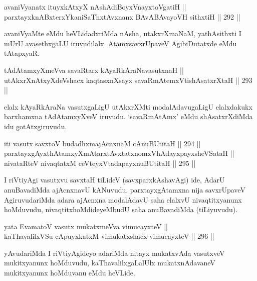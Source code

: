 \begin{shl}
avaniVyanatx ituyxkAtxyX nAshAdiBoyxV\s nayxtoVgatiH || \\
parxtayxknABxterxYkaniSaThxtAvxnanx BAvABAvayoVH sithxtiH \hfill || 292 ||  
\end{shl}

\vskip 2cm
\begin{artha}
avaniVyaMte eMdu heVLidadxriMda nAsha, utakxrXmaNaM, yathAsithxti I mUrU avasethxgaLU iruvudilalx. AtamxsavxrUpaveV AgibiDutatxde eMdu tAtapxyaR.
\end{artha}

\begin{shl}
tAdAtamxyXmeVva savaRtarx kAyaRkAraNavasutxnaH || \\
utAkxrXnAtxyXdeVshacx kaqtasxnXsayx savaRmAtemxVtishAsatxrXtaH \hfill || 293 ||  
\end{shl}

\begin{artha}
elalx kAyaRkAraNa vasutxgaLigU utAkxrXMti modalAdavugaLigU elalxdakukx
barxhamxna tAdAtamxyXveV iruvudu. `savaRmAtAmx' eMdu shAsatxrXdiMda idu gotAtxgiruvudu.
\end{artha}

\begin{shl}
iti vasutx savxtoV budadhxmajAcnxnaM cAnuBUtitaH \hfill || 294 ||  \\
parxtayxgAyxthAtamxyXmAtarxtAvxtatxnomxVhAdayxpayxsheVSataH || \\
nivataRteV nivaqtatxM ceVteyxVtadapayxnuBUtitaH \hfill || 295 ||  
\end{shl}

\begin{artha}
I riVtiyAgi vasutxvu savxtaH tiLideV (savxparxkAshavAgi) ide, AdarU
anuBavadiMda ajAcnxnavU kANuvudu, parxtayxgAtamxna nija savxrUpaveV
AgiruvudariMda adara ajAcnxna modalAdavU saha elalxvU nivaqtitxyanunx
hoMduvudu, nivaqtitxhoMdideyeMbudU saha anuBavadiMda (tiLiyuvudu).
\end{artha}

\begin{shl}
yata EvamatoV vasutx mukatxmeVva vimucayxteV || \\
kaThavalilxVSu cApuyxkatxM vimukatxshacx vimucayxteV \hfill || 296 ||  
\end{shl}

\begin{artha}
yAvudariMda I riVtiyAgideyo adariMda nitayx mukatxvAda vasutxveV
mukitxyanunx hoMduvudu, kaThavalilxgaLalUlx mukatxnAdavaneV mukitxyanunx hoMduvanu eMdu heVLide.
\end{artha}

